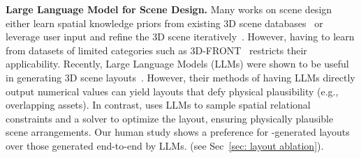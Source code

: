 \smallbreak
\noindent \textbf{Large Language Model for Scene Design.}
Many works on scene design either learn spatial knowledge priors from existing 3D scene databases~\cite{chang2017sceneseer,tan2019text2scene,ma2018language,tang2023diffuscene,zhao2023roomdesigner,wang2021sceneformer,wei2023lego} or leverage user input and refine the 3D scene iteratively~\cite{chang2014interactive,cheng2019interactive}. However, having to learn from datasets of limited categories such as 3D-FRONT~\cite{fu20213d} restricts their applicability. Recently, Large Language Models (LLMs) were shown to be useful in generating 3D scene layouts~\cite{feng2023layoutgpt,lin2023towards}.
However, their methods of having LLMs directly output numerical values can yield layouts that defy physical plausibility (e.g., overlapping assets). In contrast, %
\holodeck uses LLMs to sample spatial relational constraints and a solver to optimize the layout, ensuring physically plausible scene arrangements. 
Our human study shows a preference for \holodeck-generated layouts over those generated end-to-end by LLMs. (see Sec~\ref{sec: layout ablation}).


